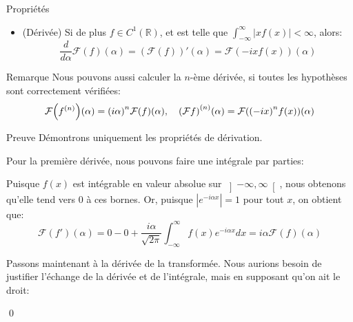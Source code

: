 \documentclass[a4paper]{article}
\begin{document}
\begin{parag}{Propriétés}
\begin{itemize}
        \item (Dérivée) Si de plus $f \in C^1\left(\mathbb{R}\right)$, et est telle que $\int_{-\infty}^{\infty} \left|x f\left(x\right)\right| < \infty$, alors:
        \[\frac{d}{d \alpha}  \mathcal{F}\left(f\right)\left(\alpha\right) = \left(\mathcal{F}\left(f\right)\right)'\left(\alpha\right) = \mathcal{F}\left(-ix f\left(x\right)\right)\left(\alpha\right)\]
    \end{itemize}

    \begin{subparag}{Remarque}
        Nous pouvons aussi calculer la $n$-ème dérivée, si toutes les hypothèses sont correctement vérifiées: 
        \[\mathcal{F} \left(f^{\left(n\right)}\right)\left(\alpha\right) = \left(i\alpha\right)^n \mathcal{F}\left(f\right)\left(\alpha\right), \mathspace \left(\mathcal{F} f\right)^{\left(n\right)} \left(\alpha\right) = \mathcal{F}\left(\left(-ix\right)^n f\left(x\right)\right)\left(\alpha\right)\]
    \end{subparag}
    
    \begin{subparag}{Preuve}
        Démontrons uniquement les propriétés de dérivation.
        
        Pour la première dérivée, nous pouvons faire une intégrale par parties:
        
        Puisque $f\left(x\right)$ est intégrable en valeur absolue sur $\left]-\infty, \infty\right[ $, nous obtenons qu'elle tend vers 0 à ces bornes. Or, puisque $\left|e^{-i \alpha x}\right| = 1$ pour tout $x$, on obtient que: 
        \[\mathcal{F}\left(f'\right)\left(\alpha\right) = 0 - 0 + \frac{i\alpha}{\sqrt{2\pi}} \int_{-\infty}^{\infty} f\left(x\right) e^{-i \alpha x}dx =  i \alpha \mathcal{F}\left(f\right)\left(\alpha\right)\]
        
        Passons maintenant à la dérivée de la transformée. Nous aurions besoin de justifier l'échange de la dérivée et de l'intégrale, mais en supposant qu'on ait le droit: 
        
        \qed
    \end{subparag}
\end{parag}
\end{document}
